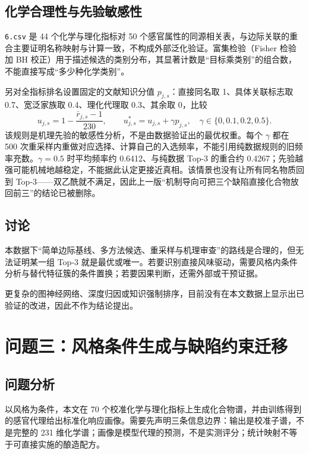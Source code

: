 \documentclass[UTF8,a4paper,zihao=-4]{ctexart}
\numberwithin{figure}{section}
\numberwithin{table}{section}
\numberwithin{equation}{section}
\newcommand{\file}[1]{\texttt{#1}}
\begin{document}
\subsection{化学合理性与先验敏感性}

\file{6.csv} 是 44 个化学与理化指标对 50 个感官属性的同源相关表，与边际关联的重合主要证明名称映射与计算一致，不构成外部泛化验证。富集检验（Fisher 检验加 BH 校正）用于描述候选的类别分布，其显著计数是“目标乘类别”的组合数，不能直接写成“多少种化学类别”。

另对全指标排名设置固定的文献知识分值 $p_{j,s}$：直接同名取 1、具体关联标志取 0.7、宽泛家族取 0.4、理化代理取 0.3、其余取 0，比较
\begin{equation}
u_{j,s}=1-\frac{\bar r_{j,s}-1}{230},\qquad u^{*}_{j,s}=u_{j,s}+\gamma p_{j,s},\quad\gamma\in\{0,0.1,0.2,0.5\}.
\label{eq:prior}
\end{equation}
该规则是机理先验的敏感性分析，不是由数据验证出的最优权重。每个 $\gamma$ 都在 500 次重采样内重做对应选择、计算自己的入选频率，不能引用纯数据规则的旧频率充数。$\gamma=0.5$ 时平均频率约 0.6412、与纯数据 Top-3 的重合约 0.4267；先验越强可能机械地越稳定，不能据此认定更接近真相。该情景也没有让所有同名物质回到 Top-3——双乙酰就不满足，因此上一版“机制导向可把三个缺陷直接化合物放回前三”的结论已被删除。

\subsection{讨论}

本数据下“简单边际基线、多方法候选、重采样与机理审查”的路线是合理的，但无法证明某一组 Top-3 就是最优或唯一。若要识别直接风味驱动，需要风格内条件分析与替代特征簇的条件置换；若要因果判断，还需外部或干预证据。

更复杂的图神经网络、深度归因或知识强制排序，目前没有在本文数据上显示出已验证的改进，因此不作为结论提出。

\section{问题三：风格条件生成与缺陷约束迁移}
\label{sec:q3}

\subsection{问题分析}

以风格为条件，本文在 70 个校准化学与理化指标上生成化合物谱，并由训练得到的感官代理给出标准化响应画像。需要先声明三条信息边界：输出是校准子谱，不是完整的 231 维化学谱；画像是模型代理的预测，不是实测评分；统计映射不等于可直接实施的酿造配方。
\end{document}
